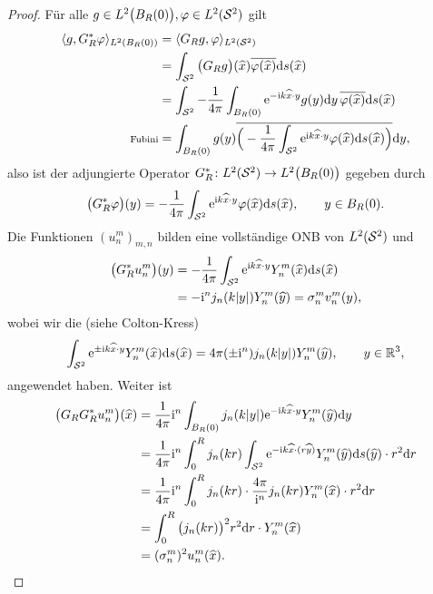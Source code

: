 \begin{proof}
	Für alle \(g\in L^2\big(B_R(0)\big),\varphi\in L^2(\mathcal{S}^2)\) gilt
	\begin{align*}
		\langle g,G_R^\ast\varphi\rangle_{L^2(B_R(0))}&=\langle G_Rg, \varphi\rangle_{L^2(\mathcal{S}^2)}\\
		&=\int_{\mathcal{S}^2}\big(G_Rg\big)(\widehat{x})\overline{\varphi(\widehat{x})}\mathrm{d}s(\widehat{x})\\
		&=\int_{\mathcal{S}^2}-\frac{1}{4\pi}\int_{B_R(0)}\mathrm{e}^{-\mathrm{i} k\widehat{x}\cdot y}g(y)\mathrm{d}y\,\overline{\varphi(\widehat{x})}\mathrm{d}s(\widehat{x})\\
		\text{\scriptsize Fubini}
		&=\int_{B_R(0)}g(y)\overline{\Big(-\frac{1}{4\pi}\int_{\mathcal{S}^2}\mathrm{e}^{\mathrm{i} k\widehat{x}\cdot y}\varphi(\widehat{x})\mathrm{d}s(\widehat{x})\Big)}\mathrm{d}y,
	\end{align*}
	also ist der adjungierte Operator \(G_R^\ast\colon L^2(\mathcal{S}^2) \to L^2\big(B_R(0)\big)\) gegeben durch
	\begin{equation*}
		\big(G_R^\ast\varphi\big)(y)=-\frac{1}{4\pi}\int_{\mathcal{S}^2}\mathrm{e}^{\mathrm{i} k\widehat{x}\cdot y}\varphi(\widehat{x})\mathrm{d}s(\widehat{x}),\qquad y\in B_R(0).
	\end{equation*}
	Die Funktionen \((u_n^m)_{m,n}\) bilden eine vollständige ONB von \(L^2(\mathcal{S}^2)\) und 
	\begin{align*}
		\big(G_R^\ast u_n^m\big)(y)&=-\frac{1}{4\pi}\int_{\mathcal{S}^2}\mathrm{e}^{\mathrm{i} k\widehat{x}\cdot y}Y_n^m(\widehat{x})\mathrm{d}s(\widehat{x})\\
		&=-\mathrm{i}^nj_n(k|y|)Y_n^m(\widehat{y}) = \sigma_n^mv_n^m(y),
	\end{align*}
	wobei wir die  (siehe Colton-Kress)
	\begin{equation*}
		\int_{\mathcal{S}^2}\mathrm{e}^{\pm\mathrm{i} k\widehat{x}\cdot y}Y_n^m(\widehat{x})\mathrm{d}s(\widehat{x})=4\pi(\pm\mathrm{i}^n)j_n(k|y|)Y_n^m(\widehat{y}),\qquad y\in\mathbb{R}^3,
	\end{equation*}
	angewendet haben. Weiter ist
	\begin{align*}
		\big(G_RG_R^\ast u_n^m\big)(\widehat{x})&=\frac{1}{4\pi}\mathrm{i}^n\int_{B_R(0)}j_n(k|y|)\mathrm{e}^{-\mathrm{i} k\widehat{x}\cdot y}Y_n^m(\widehat{y})\mathrm{d}y\\
		&=\frac{1}{4\pi}\mathrm{i}^n\int_0^Rj_n(kr)\int_{\mathcal{S}^2}\mathrm{e}^{-\mathrm{i} k\widehat{x}\cdot(r\widehat{y})}Y_n^m(\widehat{y})\mathrm{d}s(\widehat{y})\cdot r^2\mathrm{d}r\\
		&=\frac{1}{4\pi}\mathrm{i}^n\int_0^Rj_n(kr)\cdot\frac{4\pi}{\mathrm{i}^n}j_n(kr)Y_n^m(\widehat{x})\cdot r^2\mathrm{d}r\\
		&=\int_0^R\big(j_n(kr)\big)^2r^2\mathrm{d}r\cdot Y_n^m(\widehat{x})\\
		&=(\sigma_n^m)^2u_n^m(\widehat{x}).
	\end{align*}
\end{proof}
